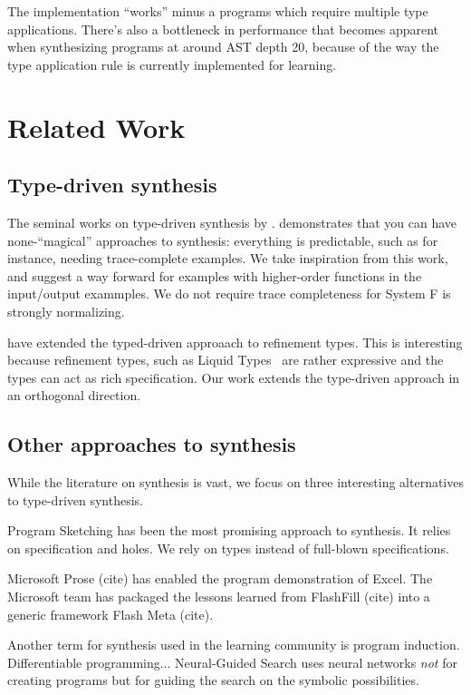 \documentclass[acmsmall]{acmart}
\theoremstyle{mytheoremstyle}
\begin{document}
The implementation ``works'' minus a programs which require multiple type applications. There's also a bottleneck in performance that becomes apparent when synthesizing programs at around AST depth 20, because of the way the type application rule is currently implemented for learning.

\section{Related Work}

\subsection{Type-driven synthesis}

The seminal works on type-driven synthesis by \citet{osera2015program}. demonstrates that you can have none-``magical'' approaches to synthesis: everything is predictable, such as for instance, needing trace-complete examples. We take inspiration from this work, and suggest a way forward for examples with higher-order functions in the input/output exammples. We do not require trace completeness for System F is strongly normalizing.

\citet{polikarpova2016program} have extended the typed-driven approaach to refinement types. This is interesting because refinement types, such as Liquid Types~\cite{lrondon2012liquid} are rather expressive and the types can act as rich specification. Our work extends the type-driven approach in an orthogonal direction.

\subsection{Other approaches to synthesis}

While the literature on synthesis is vast, we focus on three interesting alternatives to type-driven synthesis.

Program Sketching has been the most promising approach to synthesis. It relies on specification and holes. We rely on types instead of full-blown specifications.

Microsoft Prose (cite) has enabled the program demonstration of Excel. The Microsoft team has packaged the lessons learned from FlashFill (cite) into a generic framework Flash Meta (cite).

Another term for synthesis used in the learning community is program induction.
Differentiable programming...
Neural-Guided Search uses neural networks \emph{not} for creating programs but for guiding the search on the symbolic possibilities.
\end{document}
